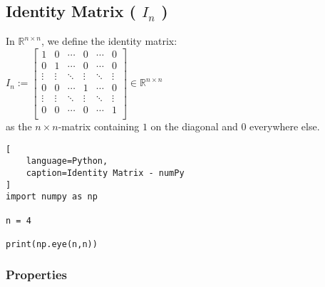 \subsection{Identity Matrix ( $I_n$ )}

In $\mathbb{R}^{n\times n}$, we define the identity matrix:\\
\vspace{0.5cm}
\hfill
$
    I_n
    := \begin{bmatrix}
        1 & 0 & \cdots & 0 & \cdots & 0 \\
        0 & 1 & \cdots & 0 & \cdots & 0 \\
        \vdots & \vdots & \ddots & \vdots & \ddots & \vdots \\
        0 & 0 & \cdots & 1 & \cdots & 0 \\
        \vdots & \vdots & \ddots & \vdots & \ddots & \vdots \\
        0 & 0 & \cdots & 0 & \cdots & 1 \\
    \end{bmatrix}
    \in \mathbb{R}^{n\times n}
$
\hfill \cite{mfml/book/mml/Deisenroth-Faisal-Ong}
\\
as the $n \times n$-matrix containing $1$ on the diagonal and $0$ everywhere else.







\begin{lstlisting}[
    language=Python,
    caption=Identity Matrix - numPy
]
import numpy as np

n = 4

print(np.eye(n,n))
\end{lstlisting}








\subsubsection{Properties}

